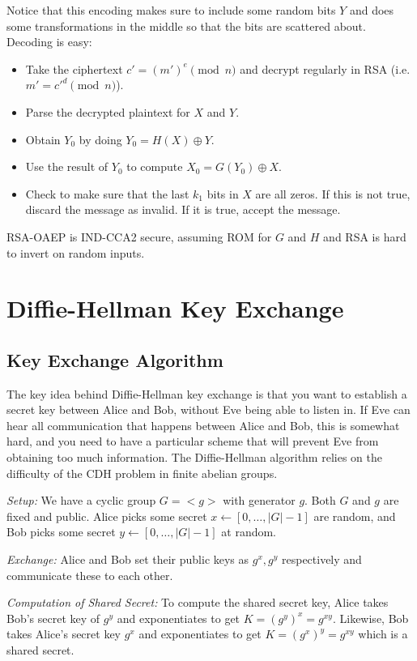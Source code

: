 \documentclass[psamsfonts]{amsart}
\begin{document}
Notice that this encoding makes sure to include some random bits $Y$ and does some transformations in the middle so that the bits are scattered about. Decoding is easy:
\begin{itemize}
  \item Take the ciphertext $c' = (m')^e \pmod{n}$ and decrypt regularly in RSA (i.e. $m' = c'^d \pmod{n}$).
  \item Parse the decrypted plaintext for $X$ and $Y$.
  \item Obtain $Y_0$ by doing $Y_0 = H(X) \oplus Y$.
  \item Use the result of $Y_0$ to compute $X_0 = G(Y_0) \oplus X$.
  \item Check to make sure that the last $k_1$ bits in $X$ are all zeros. If this is not true, discard the message as invalid. If it is true, accept the message.
\end{itemize}

RSA-OAEP is IND-CCA2 secure, assuming ROM for $G$ and $H$ and RSA is hard to invert on random inputs.

\newpage

\section{Diffie-Hellman Key Exchange}

\subsection{Key Exchange Algorithm}

The key idea behind Diffie-Hellman key exchange is that you want to establish a secret key between Alice and Bob, without Eve being able to listen in. If Eve can hear all communication that happens between Alice and Bob, this is somewhat hard, and you need to have a particular scheme that will prevent Eve from obtaining too much information. The Diffie-Hellman algorithm relies on the difficulty of the CDH problem in finite abelian groups.

\emph{Setup:} We have a cyclic group $G = <g>$ with generator $g$. Both $G$ and $g$ are fixed and public. Alice picks some secret $x \leftarrow [0,\ldots,|G|-1]$ are random, and Bob picks some secret $y \leftarrow [0, \ldots, |G|-1]$ at random.

\emph{Exchange:} Alice and Bob set their public keys as $g^x, g^y$ respectively and communicate these to each other.

\emph{Computation of Shared Secret:} To compute the shared secret key, Alice takes Bob's secret key of $g^y$ and exponentiates to get $K = (g^y)^x = g^{xy}$. Likewise, Bob takes Alice's secret key $g^x$ and exponentiates to get $K = (g^x)^y = g^{xy}$ which is a shared secret.
\end{document}
